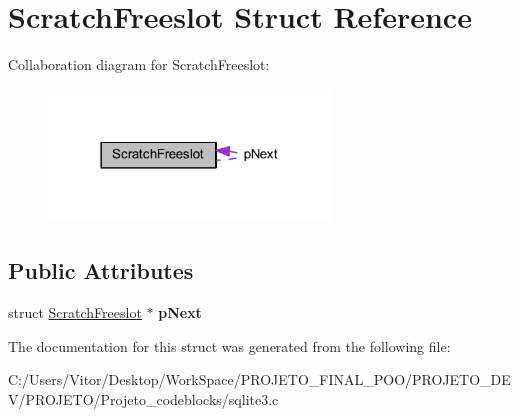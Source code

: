 \hypertarget{struct_scratch_freeslot}{\section{Scratch\-Freeslot Struct Reference}
\label{struct_scratch_freeslot}
}


Collaboration diagram for Scratch\-Freeslot\-:\nopagebreak
\begin{figure}[H]
\begin{center}
\leavevmode
\includegraphics[width=213pt]{struct_scratch_freeslot__coll__graph}
\end{center}
\end{figure}
\subsection*{Public Attributes}
\begin{DoxyCompactItemize}
\item 
\hypertarget{struct_scratch_freeslot_aca5c55a56a2a63a5be0756707a04bee8}{struct \hyperlink{struct_scratch_freeslot}{Scratch\-Freeslot} $\ast$ {\bfseries p\-Next}}\label{struct_scratch_freeslot_aca5c55a56a2a63a5be0756707a04bee8}

\end{DoxyCompactItemize}


The documentation for this struct was generated from the following file\-:\begin{DoxyCompactItemize}
\item 
C\-:/\-Users/\-Vitor/\-Desktop/\-Work\-Space/\-P\-R\-O\-J\-E\-T\-O\-\_\-\-F\-I\-N\-A\-L\-\_\-\-P\-O\-O/\-P\-R\-O\-J\-E\-T\-O\-\_\-\-D\-E\-V/\-P\-R\-O\-J\-E\-T\-O/\-Projeto\-\_\-codeblocks/sqlite3.\-c\end{DoxyCompactItemize}
